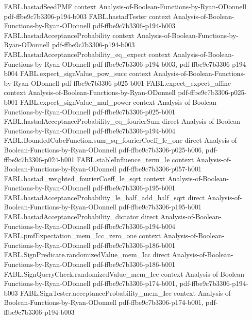 \begin{theorem}
  {FABL.hastadSeedPMF}
  {context}
  {Analysis-of-Boolean-Functions-by-Ryan-ODonnell}
  {pdf-ffbe9c7b3306-p194-b003}
\proofstep
  {FABL.hastadTester}
  {context}
  {Analysis-of-Boolean-Functions-by-Ryan-ODonnell}
  {pdf-ffbe9c7b3306-p194-b003}
\proofstep
  {FABL.hastadAcceptanceProbability}
  {context}
  {Analysis-of-Boolean-Functions-by-Ryan-ODonnell}
  {pdf-ffbe9c7b3306-p194-b003}
\proofstep
  {FABL.hastadAcceptanceProbability_eq_expect}
  {context}
  {Analysis-of-Boolean-Functions-by-Ryan-ODonnell}
  {pdf-ffbe9c7b3306-p194-b003,
    pdf-ffbe9c7b3306-p194-b004}
\proofstep
  {FABL.expect_signValue_pow_succ}
  {context}
  {Analysis-of-Boolean-Functions-by-Ryan-ODonnell}
  {pdf-ffbe9c7b3306-p025-b001}
\proofstep
  {FABL.expect_expect_affine}
  {context}
  {Analysis-of-Boolean-Functions-by-Ryan-ODonnell}
  {pdf-ffbe9c7b3306-p025-b001}
\proofstep
  {FABL.expect_signValue_mul_power}
  {context}
  {Analysis-of-Boolean-Functions-by-Ryan-ODonnell}
  {pdf-ffbe9c7b3306-p025-b001}
\proofstep
  {FABL.hastadAcceptanceProbability_eq_fourierSum}
  {direct}
  {Analysis-of-Boolean-Functions-by-Ryan-ODonnell}
  {pdf-ffbe9c7b3306-p194-b004}
\proofstep
  {FABL.BoundedCubeFunction.sum_sq_fourierCoeff_le_one}
  {direct}
  {Analysis-of-Boolean-Functions-by-Ryan-ODonnell}
  {pdf-ffbe9c7b3306-p025-b006,
    pdf-ffbe9c7b3306-p024-b001}
\proofstep
  {FABL.stableInfluence_term_le}
  {context}
  {Analysis-of-Boolean-Functions-by-Ryan-ODonnell}
  {pdf-ffbe9c7b3306-p057-b001}
\proofstep
  {FABL.hastad_weighted_fourierCoeff_le_sqrt}
  {context}
  {Analysis-of-Boolean-Functions-by-Ryan-ODonnell}
  {pdf-ffbe9c7b3306-p195-b001}
\proofstep
  {FABL.hastadAcceptanceProbability_le_half_add_half_sqrt}
  {direct}
  {Analysis-of-Boolean-Functions-by-Ryan-ODonnell}
  {pdf-ffbe9c7b3306-p195-b001}
\proofstep
  {FABL.hastadAcceptanceProbability_dictator}
  {direct}
  {Analysis-of-Boolean-Functions-by-Ryan-ODonnell}
  {pdf-ffbe9c7b3306-p194-b004}
\proofstep
  {FABL.pmfExpectation_mem_Icc_zero_one}
  {context}
  {Analysis-of-Boolean-Functions-by-Ryan-ODonnell}
  {pdf-ffbe9c7b3306-p186-b001}
\proofstep
  {FABL.SignPredicate.randomizedValue_mem_Icc}
  {direct}
  {Analysis-of-Boolean-Functions-by-Ryan-ODonnell}
  {pdf-ffbe9c7b3306-p186-b001}
\proofstep
  {FABL.SignQueryCheck.randomizedValue_mem_Icc}
  {context}
  {Analysis-of-Boolean-Functions-by-Ryan-ODonnell}
  {pdf-ffbe9c7b3306-p174-b001,
    pdf-ffbe9c7b3306-p194-b003}
\proofstep
  {FABL.SignTester.acceptanceProbability_mem_Icc}
  {context}
  {Analysis-of-Boolean-Functions-by-Ryan-ODonnell}
  {pdf-ffbe9c7b3306-p174-b001,
    pdf-ffbe9c7b3306-p194-b003}

\end{theorem}
